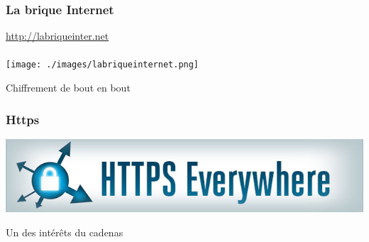 \documentclass{beamer}
\begin{document}
\begin{frame}
\begin{center}
\frametitle{La brique Internet}
\url{http://labriqueinter.net}
\\~\\
\texttt{[image: ./images/labriqueinternet.png]}
\end{center}
\end{frame}

\begin{frame}
\begin{center}
\Huge {Chiffrement de bout en bout}
\end{center}
\end{frame}

\begin{frame}
\begin{center}
\frametitle{Https}
\includegraphics[scale=0.5] {./images/https-everywhere.jpg}
\end{center}

\begin{block}{Un des intérêts du cadenas}
\end{block}
\end{frame}
\end{document}

